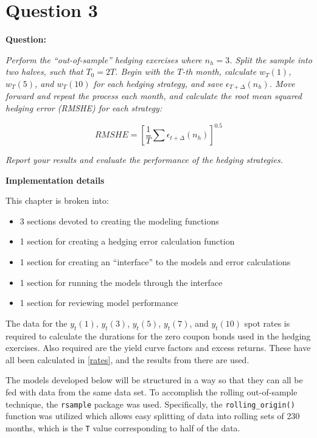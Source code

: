 \documentclass[openany]{book}
\providecommand{\tightlist}{%
  \setlength{\itemsep}{0pt}\setlength{\parskip}{0pt}}
\theoremstyle{definition}
\theoremstyle{definition}
\theoremstyle{definition}
\theoremstyle{remark}
\begin{document}
\normalsize

\hypertarget{q3}{%
\chapter{Question 3}\label{q3}}

\textbf{Question:}

\emph{Perform the ``out-of-sample'' hedging exercises where \(n_h = 3\).
Split the sample into two halves, such that \(T_0 = 2T\). Begin with the
\(T\)-th month, calculate \(w_T(1)\), \(w_T(5)\), and \(w_T(10)\) for
each hedging strategy, and save \(\epsilon_{T+\Delta}(n_h)\). Move
forward and repeat the process each month, and calculate the root mean
squared hedging error (RMSHE) for each strategy:}

\[ RMSHE = [\frac{1}{T} \sum{\epsilon_{t+\Delta}(n_h)}]^{0.5} \]

\emph{Report your results and evaluate the performance of the hedging
strategies.}

\textbf{Implementation details}

This chapter is broken into:

\begin{itemize}
\tightlist
\item
  3 sections devoted to creating the modeling functions
\item
  1 section for creating a hedging error calculation function
\item
  1 section for creating an ``interface'' to the models and error
  calculations
\item
  1 section for running the models through the interface
\item
  1 section for reviewing model performance
\end{itemize}

\small

\normalsize

The data for the \(y_t(1)\), \(y_t(3)\), \(y_t(5)\), \(y_t(7)\), and
\(y_t(10)\) spot rates is required to calculate the durations for the
zero coupon bonds used in the hedging exercises. Also required are the
yield curve factors and excess returns. These have all been calculated
in \ref{rates}, and the results from there are used.

\small

\normalsize

The models developed below will be structured in a way so that they can
all be fed with data from the same data set. To accomplish the rolling
out-of-sample technique, the \texttt{rsample} package was used.
Specifically, the \texttt{rolling\_origin()} function was utilized which
allows easy splitting of data into rolling sets of 230 months, which is
the \texttt{T} value corresponding to half of the data.
\end{document}
